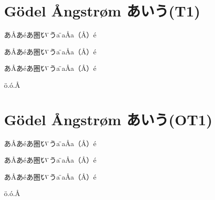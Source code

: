 \documentclass{jarticle}
\def\test{あ\AA あ\'eあ\'圏い\"圏うa\"圏a\AA a（\AA）\'e}
\begin{document}
\selectfont
\section{G\"odel \AA ngstr\o m あいう(T1)}
\test\par
{}
\test

\test

\edef\XA{\"o.\'o.\AA}
{\ttfamily\meaning\XA}


\selectfont
\section{G\"odel \AA ngstr\o m あいう(OT1)}
\test\par
{}
\test

\test

\edef\XA{\"o.\'o.\AA}
{\ttfamily \meaning\XA}
\end{document}

